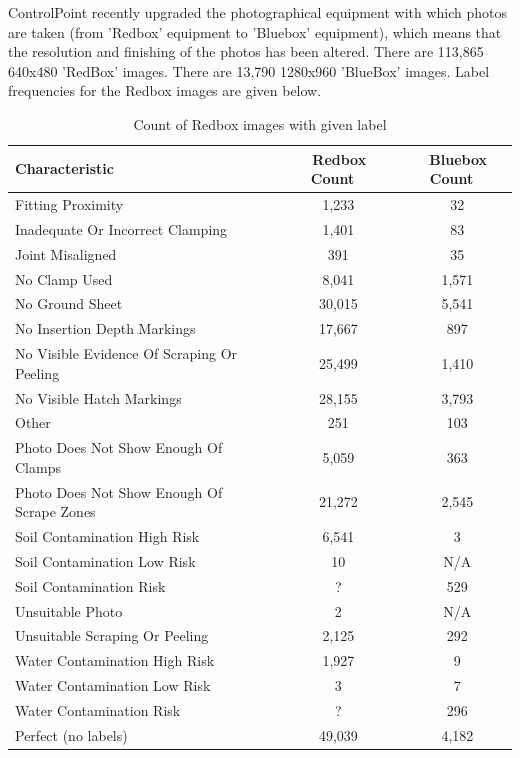 \documentclass[a4paper,11pt]{article}
\begin{document}
ControlPoint recently upgraded the photographical equipment with which photos are taken (from 'Redbox' equipment to 'Bluebox' equipment), which means that the resolution and finishing of the photos has been altered. There are 113,865 640x480 'RedBox' images. There are 13,790 1280x960 'BlueBox' images. Label frequencies for the Redbox images are given below.

\begin{table}[h]
   \centering
    \begin{tabular}{|l|c|c|}
    \hline
    Characteristic                              & ~ Redbox Count  & ~ Bluebox Count \\ \hline
    Fitting Proximity                           & ~  1,233        & ~ 32      \\
    Inadequate Or Incorrect Clamping            & ~ 1,401         & ~ 83      \\
    Joint Misaligned                            & ~ 391           & ~ 35      \\
    No Clamp Used                               & ~ 8,041         & ~ 1,571   \\
    No Ground Sheet                             & ~  30,015       & ~ 5,541   \\
    No Insertion Depth Markings                 & ~ 17,667        & ~ 897     \\
    No Visible Evidence Of Scraping Or Peeling  & ~ 25,499        & ~ 1,410   \\
    No Visible Hatch Markings                   & ~ 28,155        & ~ 3,793   \\
    Other                                       & ~  251          & ~ 103     \\
    Photo Does Not Show Enough Of Clamps        & ~ 5,059         & ~ 363     \\
    Photo Does Not Show Enough Of Scrape Zones  & ~ 21,272        & ~ 2,545   \\
    Soil Contamination High Risk                & ~ 6,541         & ~ 3       \\
    Soil Contamination Low Risk                 & ~ 10            & ~ N/A     \\
    Soil Contamination Risk                     & ~ ?             & ~ 529     \\
    Unsuitable Photo                            & ~ 2             & ~ N/A     \\
    Unsuitable Scraping Or Peeling              & ~ 2,125         & ~ 292     \\
    Water Contamination High Risk               & ~ 1,927         & ~ 9       \\
    Water Contamination Low Risk                & ~ 3             & ~ 7       \\
	Water Contamination Risk                    & ~ ?             & ~ 296     \\
     \hline
    Perfect (no labels)                         & ~ 49,039        & ~ 4,182   \\
    \hline
    \end{tabular}
    \caption {Count of Redbox images with given label}
\end{table} 
\end{document}
